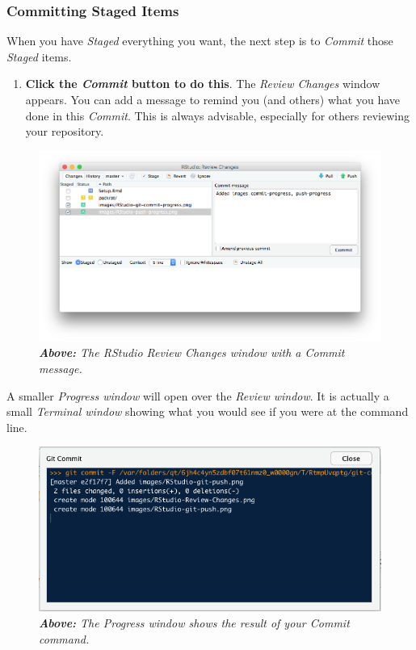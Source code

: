\documentclass[]{book}
\providecommand{\tightlist}{%
  \setlength{\itemsep}{0pt}\setlength{\parskip}{0pt}}
\theoremstyle{definition}
\theoremstyle{definition}
\theoremstyle{definition}
\theoremstyle{remark}
\begin{document}
\hypertarget{committing-staged-items}{%
\subsubsection{Committing Staged Items}\label{committing-staged-items}}

When you have \emph{Staged} everything you want, the next step is to
\emph{Commit} those \emph{Staged} items.

\begin{enumerate}
\def\labelenumi{\arabic{enumi}.}
\setcounter{enumi}{3}
\tightlist
\item
  \textbf{Click the \emph{Commit} button to do this}. The \emph{Review
  Changes} window appears. You can add a message to remind you (and
  others) what you have done in this \emph{Commit}. This is always
  advisable, especially for others reviewing your repository.
\end{enumerate}

\begin{figure}
\centering
\includegraphics{images/RStudio-review-changes.png}
\caption{\emph{\textbf{Above:} The RStudio Review Changes window with a
Commit message.}}
\end{figure}

A smaller \emph{Progress window} will open over the \emph{Review
window}. It is actually a small \emph{Terminal window} showing what you
would see if you were at the command line.

\begin{figure}
\centering
\includegraphics{images/RStudio-git-commit-progress.png}
\caption{\emph{\textbf{Above:} The Progress window shows the result of
your Commit command.}}
\end{figure}
\end{document}
